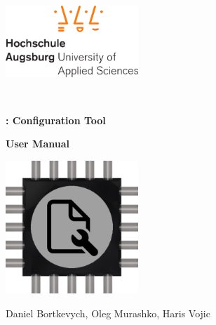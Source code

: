 	
	\sloppy
	
	\begin{titlepage}
		
		\begin{flushright}
			\includegraphics[width=5cm]{images/hsa_logo}
			\par\end{flushright}
		
		\begin{center}
			\vfill ~ \vfill
			\par\end{center}
		
		\begin{doublespace}
			\begin{center}
				\textsf{\textbf{\Huge{} \paranut: Configuration Tool}}
				\par\end{center}{\Huge \par}
			
			\begin{center}
				\textsf{\textbf{\large{}User Manual}}
				\par\end{center}{\large \par}
		\end{doublespace}
		
		\begin{center}
			\includegraphics[width=5cm]{images/config_logo}

			\textsf{\vfill}
			\par\end{center}
		
		\begin{center}
			\textsf{\LARGE{}Daniel Bortkevych, Oleg Murashko, Haris Vojic}
			\par\end{center}{\LARGE \par}
		

\end{titlepage}
